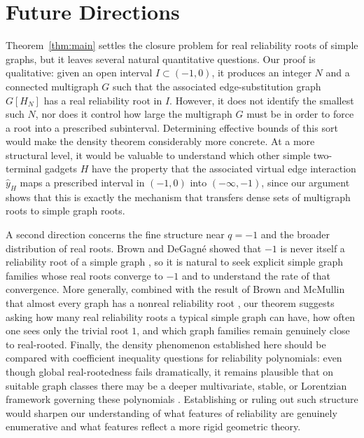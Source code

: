 \documentclass[12pt]{amsart}
\theoremstyle{definition}
\begin{document}
\section{Future Directions}\label{sec:future}

Theorem~\ref{thm:main} settles the closure problem for real reliability roots of simple graphs, but it leaves several natural quantitative questions. Our proof is qualitative: given an open interval $I \subset (-1,0)$, it produces an integer $N$ and a connected multigraph $G$ such that the associated edge-substitution graph $G[H_N]$ has a real reliability root in $I$. However, it does not identify the smallest such $N$, nor does it control how large the multigraph $G$ must be in order to force a root into a prescribed subinterval. Determining effective bounds of this sort would make the density theorem considerably more concrete. At a more structural level, it would be valuable to understand which other simple two-terminal gadgets $H$ have the property that the associated virtual edge interaction $\hat{y}_H$ maps a prescribed interval in $(-1,0)$ into $(-\infty,-1)$, since our argument shows that this is exactly the mechanism that transfers dense sets of multigraph roots to simple graph roots. 

A second direction concerns the fine structure near $q=-1$ and the broader distribution of real roots. Brown and DeGagn\'e showed that $-1$ is never itself a reliability root of a simple graph \cite{BrownDeGagne2020}, so it is natural to seek explicit simple graph families whose real roots converge to $-1$ and to understand the rate of that convergence. More generally, combined with the result of Brown and McMullin that almost every graph has a nonreal reliability root \cite{BrownMcMullin2026}, our theorem suggests asking how many real reliability roots a typical simple graph can have, how often one sees only the trivial root $1$, and which graph families remain genuinely close to real-rooted. Finally, the density phenomenon established here should be compared with coefficient inequality questions for reliability polynomials: even though global real-rootedness fails dramatically, it remains plausible that on suitable graph classes there may be a deeper multivariate, stable, or Lorentzian framework governing these polynomials \cite{BrandenHuh2020,ChoeOxleySokalWagner2004}. Establishing or ruling out such structure would sharpen our understanding of what features of reliability are genuinely enumerative and what features reflect a more rigid geometric theory.
\end{document}
